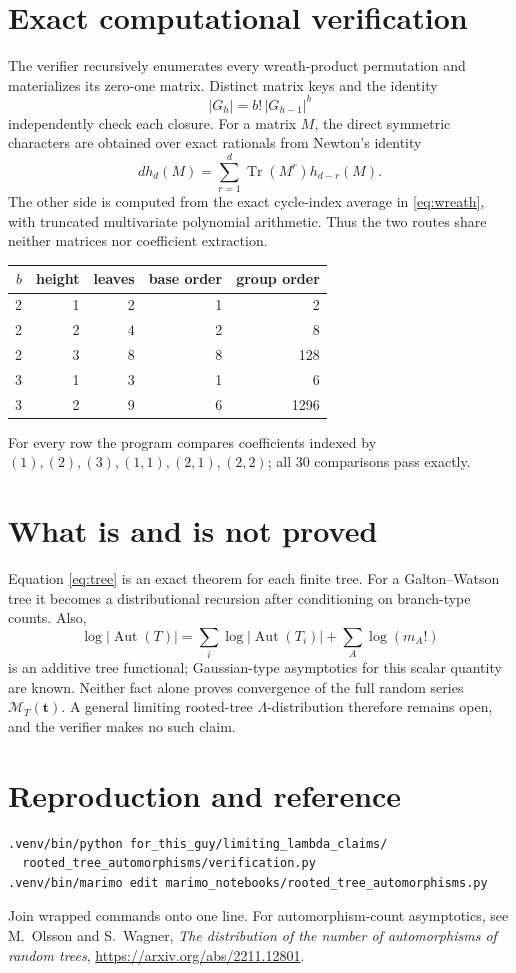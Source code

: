 \documentclass[11pt]{article}
\newcommand{\MGF}{\mathcal M}
\begin{document}
\section{Exact computational verification}
The verifier recursively enumerates every wreath-product permutation and
materializes its zero-one matrix.  Distinct matrix keys and the identity
\[
|G_h|=b!\,|G_{h-1}|^b
\]
independently check each closure.  For a matrix $M$, the direct symmetric
characters are obtained over exact rationals from Newton's identity
\[
d h_d(M)=\sum_{r=1}^d\operatorname{Tr}(M^r)h_{d-r}(M).
\]
The other side is computed from the exact cycle-index average in
\eqref{eq:wreath}, with truncated multivariate polynomial arithmetic.  Thus
the two routes share neither matrices nor coefficient extraction.

\begin{center}
\begin{tabular}{@{}rrrrr@{}}\toprule
$b$&height&leaves&base order&group order\\\midrule
2&1&2&1&2\\
2&2&4&2&8\\
2&3&8&8&128\\
3&1&3&1&6\\
3&2&9&6&1296\\\bottomrule
\end{tabular}
\end{center}
For every row the program compares coefficients indexed by
$(1),(2),(3),(1,1),(2,1),(2,2)$; all 30 comparisons pass exactly.

\section{What is and is not proved}
Equation \eqref{eq:tree} is an exact theorem for each finite tree.  For a
Galton--Watson tree it becomes a distributional recursion after conditioning
on branch-type counts.  Also,
\[
\log|\operatorname{Aut}(T)|=\sum_i\log|\operatorname{Aut}(T_i)|
+\sum_A\log(m_A!)
\]
is an additive tree functional; Gaussian-type asymptotics for this scalar
quantity are known.  Neither fact alone proves convergence of the full random
series $\MGF_T(\mathbf t)$.  A general limiting rooted-tree
$\Lambda$-distribution therefore remains open, and the verifier makes no such
claim.

\section{Reproduction and reference}
\begin{verbatim}
.venv/bin/python for_this_guy/limiting_lambda_claims/
  rooted_tree_automorphisms/verification.py
.venv/bin/marimo edit marimo_notebooks/rooted_tree_automorphisms.py
\end{verbatim}
Join wrapped commands onto one line.  For automorphism-count asymptotics, see
M.~Olsson and S.~Wagner, \emph{The distribution of the number of
automorphisms of random trees},
\url{https://arxiv.org/abs/2211.12801}.
\end{document}
